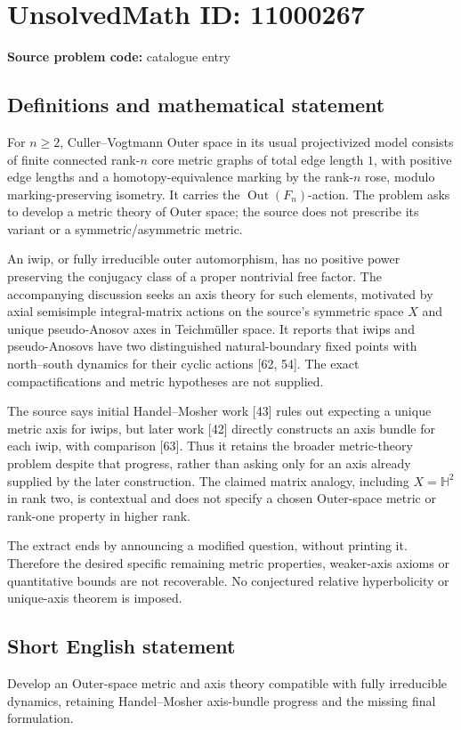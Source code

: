 \documentclass[11pt]{article}
\begin{document}
\section*{UnsolvedMath ID: 11000267}
\textbf{Source problem code:} catalogue entry
\subsection{Definitions and mathematical statement}
For \(n\geq2\), Culler--Vogtmann Outer space in its usual projectivized model consists of finite connected rank-\(n\) core metric graphs of total edge length \(1\), with positive edge lengths and a homotopy-equivalence marking by the rank-\(n\) rose, modulo marking-preserving isometry. It carries the \(\operatorname{Out}(F_n)\)-action. The problem asks to develop a metric theory of Outer space; the source does not prescribe its variant or a symmetric/asymmetric metric.

An iwip, or fully irreducible outer automorphism, has no positive power preserving the conjugacy class of a proper nontrivial free factor. The accompanying discussion seeks an axis theory for such elements, motivated by axial semisimple integral-matrix actions on the source's symmetric space \(X\) and unique pseudo-Anosov axes in Teichm\"uller space. It reports that iwips and pseudo-Anosovs have two distinguished natural-boundary fixed points with north--south dynamics for their cyclic actions [62, 54]. The exact compactifications and metric hypotheses are not supplied.

The source says initial Handel--Mosher work [43] rules out expecting a unique metric axis for iwips, but later work [42] directly constructs an axis bundle for each iwip, with comparison [63]. Thus it retains the broader metric-theory problem despite that progress, rather than asking only for an axis already supplied by the later construction. The claimed matrix analogy, including \(X=\mathbb H^2\) in rank two, is contextual and does not specify a chosen Outer-space metric or rank-one property in higher rank.

The extract ends by announcing a modified question, without printing it. Therefore the desired specific remaining metric properties, weaker-axis axioms or quantitative bounds are not recoverable. No conjectured relative hyperbolicity or unique-axis theorem is imposed.
\subsection{Short English statement}
Develop an Outer-space metric and axis theory compatible with fully irreducible dynamics, retaining Handel--Mosher axis-bundle progress and the missing final formulation.
\end{document}
